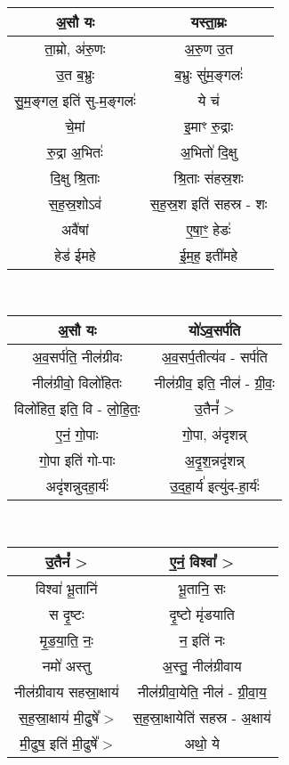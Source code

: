 {\centering
{\small {}} \\
\begin{longtable}{|c|c|}
\hline
अ॒सौ यः                   & यस्ता॒म्रः\\
\hline
ता॒म्रो, अ॑रु॒णः               & अ॒रु॒ण उ॒त\\
\hline
उ॒त ब॒भ्रुः                  & ब॒भ्रुः सु॑म॒ङ्गलः॑\\
\hline
सु॒म॒ङ्गल॒ इति॑ सु-म॒ङ्गलः॑        & ये च॑\\
\hline
चे॒मां                      & इ॒माꣳ रु॒द्राः\\
\hline
रु॒द्रा अ॒भितः॑               & अ॒भितो॑ दि॒क्षु\\
\hline
दि॒क्षु श्रि॒ताः              & श्रि॒ताः स॑हस्र॒शः\\
\hline
स॒ह॒स्र॒शोऽव॑                 & स॒ह॒स्र॒श इति॑ सहस्र - शः\\
\hline
अवै॑षां                     & ए॒षा॒ꣳ॒ हेडः॑\\
\hline
हेड॑ ईमहे                   & ई॒म॒ह॒ इती॑महे\\
\hline
\end{longtable}
}
{\centering
{\small {}} \\
\begin{longtable}{|c|c|}
\hline
अ॒सौ यः                   & यो॑ऽव॒सर्प॑ति\\
\hline
अ॒व॒सर्प॑ति॒ नील॑ग्रीवः         & अ॒व॒सर्प॒तीत्य॑व - सर्प॑ति\\
\hline
नील॑ग्रीवो॒ विलो॑हितः        & नील॑ग्रीव॒ इति॒ नील॑ - ग्री॒वः॒\\
\hline
विलो॑हित॒ इति॒ वि - लो॒हि॒तः॒  & उ॒तैनं᳚ >\\
\hline
ए॒नं॒ गो॒पाः                 & गो॒पा, अ॑दृशन्न्\\
\hline
गो॒पा इति॑ गो-पाः          & अ॒दृ॒श॒न्नदृ॑शन्न्\\
\hline
अदृ॑शन्नुदहा॒र्यः॑              & उ॒द॒हा॒र्य॑ इत्यु॑द-हा॒र्यः॑\\
\hline
\end{longtable}
}
{\centering
{\small {}} \\
\begin{longtable}{|c|c|}
\hline
उ॒तैनं᳚ >                    & ए॒नं॒ विश्वा᳚ >\\
\hline
विश्वा॑ भू॒तानि॑              & भू॒तानि॒ सः\\
\hline
स दृ॒ष्टः                   & दृ॒ष्टो मृ॑डयाति\\
\hline
मृ॒ड॒या॒ति॒ नः॒                & न॒ इति॑ नः\\
\hline
नमो॑ अस्तु                  & अ॒स्तु॒ नील॑ग्रीवाय\\
\hline
नील॑ग्रीवाय सहस्रा॒क्षाय॑      & नील॑ग्रीवा॒येति॒ नील॑ - ग्री॒वा॒य॒\\
\hline
स॒ह॒स्रा॒क्षाय॑ मी॒ढुषे᳚ >         & स॒ह॒स्रा॒क्षायेति॑ सहस्र - अ॒क्षाय॑\\
\hline
मी॒ढुष॒ इति॑ मी॒ढुषे᳚ >          & अथो॒ ये\\
\hline
\end{longtable}
}
